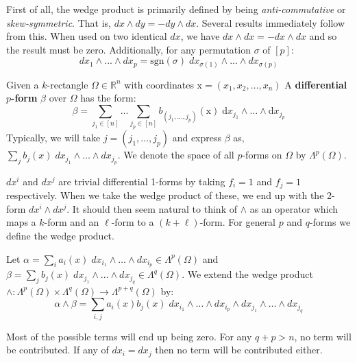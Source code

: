 First of all, the wedge product is primarily defined by being \emph{anti-commutative} or \emph{skew-symmetric}.
That is, $dx \wedge dy = -dy \wedge dx$.
Several results immediately follow from this.
When used on two identical $dx$, we have $dx \wedge dx = - dx \wedge dx$ and so the result must be zero.
Additionally, for any permutation $\sigma$ of $[p]$:
\begin{equation}
	dx_1 \wedge ... \wedge dx_p = \text{sgn}(\sigma) \; dx_{\sigma(1)} \wedge ... \wedge dx_{\sigma(p)}
\end{equation}


\begin{definition}
	Given a $k$-rectangle $\Omega \in \mathbb{R}^n$ with coordinates $\text{x} = (x_1, x_2, \ldots, x_n)$
	A \textbf{differential $p$-form} $\beta$ over $\Omega$ has the form:
	\begin{equation}
		\beta = \sum_{j_1 \in [n]} \ldots \sum_{j_p \in [n]} b_{(j_1, \ldots, j_p)}(\text{x}) \; 
				\text{d} x_{j_1} \wedge \ldots \wedge \text{d} x_{j_p}
	\end{equation}
	Typically, we will take $j = (j_1, \ldots, j_p)$ and express $\beta$ as, 
	$\sum_j b_j(x) \; dx_{j_1} \wedge \ldots \wedge dx_{j_p}$.
	We denote the space of all $p$-forms on $\Omega$ by $\Lambda^p(\Omega)$.
\end{definition}


$dx^i$ and $dx^j$ are trivial differential 1-forms by taking $f_i=1$ and $f_j=1$ respectively.
When we take the wedge product of these, we end up with the 2-form $dx^i \wedge dx^j$.
It should then seem natural to think of $\wedge$ as an operator which maps 
a $k$-form and an $\ell$-form to a $(k+\ell)$-form.
For general $p$ and $q$-forms we define the wedge product.

\begin{definition}
	Let $\alpha = \sum_i a_i(x) \; dx_{i_1} \wedge \ldots \wedge dx_{i_p} \in \Lambda^p(\Omega)$ and 
	$\beta = \sum_j b_j(x) \; dx_{j_1} \wedge \ldots \wedge dx_{j_q} \in \Lambda^q(\Omega)$. We extend the
	wedge product $\wedge : \Lambda^p(\Omega) \times \Lambda^q(\Omega) \to \Lambda^{p+q}(\Omega)$ by:
	\begin{equation}
		\alpha \wedge \beta  = \sum_{i,j} a_i(x) b_j(x) \; 
			dx_{i_1} \wedge \ldots \wedge dx_{i_p} \wedge 
			dx_{j_1} \wedge \ldots \wedge dx_{j_q}
	\end{equation}
\end{definition}

Most of the possible terms will end up being zero.
For any $q+p > n$, no term will be contributed.
If any of $dx_{i} = dx_{j}$ then no term will be contributed either.

